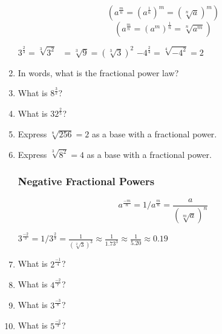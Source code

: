\documentclass{article}
\begin{document}
\begin{enumerate}
$$(a^{\frac{m}{n}}=(a^{\frac{1}{n}})^m=(\sqrt[n]{a})^m)$$
$$(a^{\frac{m}{n}}=(a^m)^{\frac{1}{n}}=\sqrt[n]{a^m})$$

\begin{center}
$3^{\frac{2}{3}}=\sqrt[3]{3^2}\text{  }=\sqrt[3]{9}=(\sqrt[3]{3})^2$
$-4^{\frac{2}{4}}=\sqrt[4]{-4^2}=2$
\end{center}

\item In words, what is the fractional power law?
\item What is $8^{\frac{3}{2}}$?
\item What is $32^{\frac{2}{5}}$?
\item Express $\sqrt[8]{256}=2$ as a base with a fractional power.
\item Express $\sqrt[3]{8^2}=4$ as a base with a fractional power.

\subsubsection*{Negative Fractional Powers}
\begin{Large}
$$a^{\frac{-m}{n}}=1/a^{\frac{m}{n}}=\frac{a}{(\sqrt[m]{a})^n}$$
\end{Large}
\begin{center}
 $3^{\frac{-2}{3}}=1/3^{\frac{2}{3}}=\frac{1}{(\sqrt[2]{3})^3}\approx \frac{1}{1.73^3}\approx\frac{1}{5.20}\approx0.19$
\end{center}

\item What is $2^{\frac{-1}{4}}$?
\item What is $4^{\frac{-2}{7}}$?
\item What is $3^{\frac{-3}{8}}$?
\item What is $5^{\frac{-2}{3}}$?

\end{enumerate}
\end{document}
